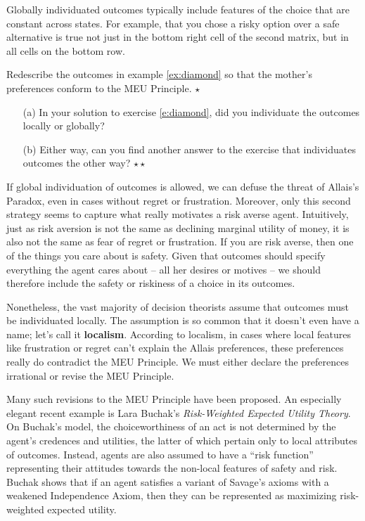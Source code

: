 Globally individuated outcomes typically include features of the
choice that are constant across states. For example, that you chose a
risky option over a safe alternative is true not just in the bottom
right cell of the second matrix, but in all cells on the bottom
row.

\begin{exercise}\label{e:diamond}
  Redescribe the outcomes in example \ref{ex:diamond} so that the
  mother's preferences conform to the MEU Principle. $\star$
\end{exercise}

\begin{exercise}
  \leavevmode\vspace{-2em}
  \begin{enumerate}
  \itemsep0em 
  \item[(a)] In your solution to exercise \ref{e:diamond}, did you
    individuate the outcomes locally or globally?
  \item[(b)] Either way, can you find another answer to the exercise that
    individuates outcomes the other way?
    $\star\star$
  \end{enumerate}
  \vspace{-2em}
\end{exercise}

If global individuation of outcomes is allowed, we can defuse the
threat of Allais's Paradox, even in cases without regret or
frustration. Moreover, only this second strategy seems to capture what
really motivates a risk averse agent. Intuitively, just as risk
aversion is not the same as declining marginal utility of money, it is
also not the same as fear of regret or frustration. If you are risk
averse, then one of the things you care about is safety. Given that
outcomes should specify everything the agent cares about -- all her
desires or motives -- we should therefore include the safety or
riskiness of a choice in its outcomes.

Nonetheless, the vast majority of decision theorists assume that
outcomes must be individuated locally. The assumption is so common
that it doesn't even have a name; let's call it
\textbf{localism}. According to localism, in cases where local
features like frustration or regret can't explain the Allais
preferences, these preferences really do contradict the MEU
Principle. We must either declare the preferences irrational or revise
the MEU Principle.

Many such revisions to the MEU Principle have been proposed. An
especially elegant recent example is Lara Buchak's \emph{Risk-Weighted
  Expected Utility Theory}. On Buchak's model, the choiceworthiness of an
act is not determined by the agent's credences and utilities, the
latter of which pertain only to local attributes of outcomes. Instead,
agents are also assumed to have a ``risk function'' representing their
attitudes towards the non-local features of safety and risk. Buchak
shows that if an agent satisfies a variant of Savage's axioms with a
weakened Independence Axiom, then they can be represented as
maximizing risk-weighted expected utility.

